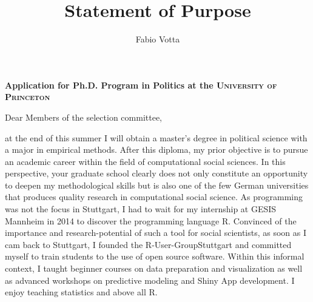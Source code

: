 \documentclass[10pt]{article}
\begin{document}
\title{Statement of Purpose}

\author{Fabio Votta}

\address{University of Stuttgart, M.A.: Empirical Social and Political Research, \href{fabio.votta@gmail.com}{fabio.votta@gmail.com}}





\vspace{0.4cm}
\begin{center}
\noindent \textbf{\large Application for Ph.D. Program in Politics at the \textsc{University of Princeton}}
\end{center}
\vspace{0.2cm}

\noindent Dear Members of the selection committee,

\vspace{0.3cm}

at the end of this summer I will obtain a master’s degree in political science with a major in empirical methods. After this diploma, my prior objective is to pursue an academic career within the ﬁeld of computational social sciences. In this perspective, your graduate school clearly does not only constitute an opportunity to deepen my methodological skills but is also one of the few German universities that produces quality research in computational social science. As programming was not the focus in Stuttgart, I had to wait for my internship at GESIS Mannheim in 2014 to discover the programming language R. Convinced of the importance and research-potential of such a tool for social scientists, as soon as I cam back to Stuttgart, I founded the R-User-GroupStuttgart and committed myself to train students to the use of open source software. Within this informal context, I taught beginner courses on data preparation and visualization as well as advanced workshops on predictive modeling and Shiny App development. I enjoy teaching statistics and above all R.

\vspace{0.3cm}
\end{document}
